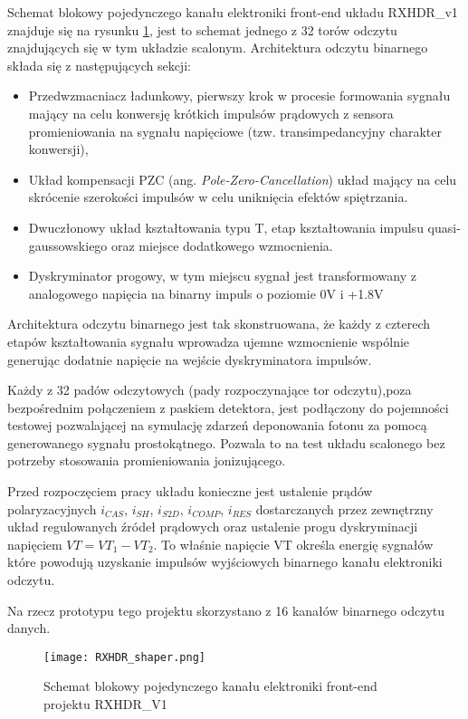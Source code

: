 Schemat blokowy pojedynczego kanału elektroniki front-end układu RXHDR\_v1 znajduje się na rysunku \ref{RXHDR schema}, jest to schemat jednego z 32 torów odczytu znajdujących się w tym układzie scalonym.  Architektura odczytu binarnego składa się z następujących sekcji:
\begin{itemize}
        \item Przedwzmacniacz ładunkowy, pierwszy krok w procesie formowania sygnału mający na celu konwersję krótkich impulsów prądowych z sensora promieniowania na sygnału napięciowe (tzw. transimpedancyjny charakter konwersji),
        \item Układ kompensacji PZC (ang. \textit{Pole-Zero-Cancellation}) układ mający na celu skrócenie szerokości impulsów w celu uniknięcia efektów spiętrzania.
        \item Dwuczłonowy układ kształtowania typu T, etap kształtowania impulsu quasi-gaussowskiego oraz miejsce dodatkowego wzmocnienia. 
        \item Dyskryminator progowy, w tym miejscu sygnał jest transformowany z analogowego napięcia na binarny impuls o poziomie 0V i +1.8V
\end{itemize}

Architektura odczytu binarnego jest tak skonstruowana, że każdy z czterech etapów kształtowania sygnału wprowadza ujemne wzmocnienie wspólnie generując dodatnie napięcie na wejście dyskryminatora impulsów. 

Każdy z 32 padów odczytowych (pady rozpoczynające tor odczytu),poza bezpośrednim połączeniem z paskiem detektora, jest podłączony do pojemności testowej pozwalającej na symulację zdarzeń deponowania fotonu za pomocą generowanego sygnału prostokątnego. Pozwala to na test układu scalonego bez potrzeby stosowania promieniowania jonizującego. 

Przed rozpoczęciem pracy układu konieczne jest ustalenie prądów polaryzacyjnych $i_{CAS}$, $i_{SH}$, $i_{S2D}$, $i_{COMP}$, $i_{RES}$ dostarczanych przez zewnętrzny układ regulowanych źródeł prądowych\cite{master} oraz ustalenie progu dyskryminacji napięciem $VT = VT_1 - VT_2$. To właśnie napięcie VT określa energię sygnałów które powodują uzyskanie impulsów wyjściowych binarnego kanału elektroniki odczytu. 

Na rzecz prototypu tego projektu skorzystano z 16 kanałów binarnego odczytu danych. 

\begin{figure}
        \texttt{[image: RXHDR\_shaper.png]}
        \caption{Schemat blokowy pojedynczego kanału elektroniki front-end projektu RXHDR\_V1}
        \label{RXHDR schema}
\end{figure}

